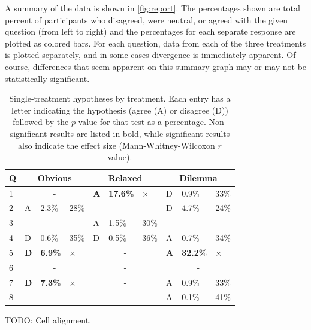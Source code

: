 A summary of the data is shown in \cref{fig:report}.
%
The percentages shown are total percent of participants who disagreed, were neutral, or agreed with the given question (from left to right) and the percentages for each separate response are plotted as colored bars.
%
For each question, data from each of the three treatments is plotted separately, and in some cases divergence is immediately apparent.
%
Of course, differences that seem apparent on this summary graph may or may not be statistically significant.


\begin{table}[!hp]
  \centering
\bgroup
\def\arraystretch{1.1}
\setlength{\tabcolsep}{0.7em}
\begin{tabular}{p{0.3em} | p{0.3em} | p{1.8em} | p{1.2em} | p{0.3em} | p{1.8em} | p{1.2em} | p{0.3em} | p{1.8em} | p{1.2em} |}
Q & \multicolumn{3}{|c|}{Obvious} & \multicolumn{3}{|c|}{Relaxed} & \multicolumn{3}{|c|}{Dilemma} \\
\hline
1  & \multicolumn{3}{|c|}{-} & \textbf{A} & \textbf{17.6\%} & $\times$  & D & 0.9\% & 33\% \\
\hline
2  & A & 2.3\% & 28\%  & \multicolumn{3}{|c|}{-} & D & 4.7\% & 24\% \\
\hline
3  & \multicolumn{3}{|c|}{-} & A & 1.5\% & 30\%  & \multicolumn{3}{|c|}{-}\\
\hline           
4  & D & 0.6\% & 35\%  & D & 0.5\% & 36\%  & A & 0.7\% & 34\% \\
\hline
5  & \textbf{D} & \textbf{6.9\%} & $\times$  & \multicolumn{3}{|c|}{-} & \textbf{A} & \textbf{32.2\%} & $\times$  \\
\hline
6  & \multicolumn{3}{|c|}{-} & \multicolumn{3}{|c|}{-} & \multicolumn{3}{|c|}{-}\\
\hline
7  & \textbf{D} & \textbf{7.3\%} & $\times$  & \multicolumn{3}{|c|}{-} & A & 0.9\% & 33\% \\
\hline
8  & \multicolumn{3}{|c|}{-} & \multicolumn{3}{|c|}{-} & A & 0.1\% & 41\% \\
\hline
\end{tabular}
\egroup
  \caption{Single-treatment hypotheses by treatment. Each entry has a letter indicating the hypothesis (agree (A) or disagree (D)) followed by the $p$-value for that test as a percentage. Non-significant results are listed in bold, while significant results also indicate the effect size (Mann-Whitney-Wilcoxon $r$ value).}
  TODO: Cell alignment.
  \label{tab:single-results}
\end{table}


